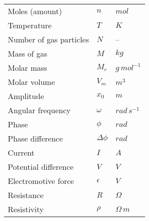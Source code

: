 \documentclass[12pt,a4 paper]{article}
\begin{document}
\begin{longtable}[H]{p{} p{} p{}}
Moles (amount) & $n$ & $\unit{mol}$ \\*
Temperature & $T$ & $\unit{K}$ \\*
Number of gas particles & $N$ & -- \\*
Mass of gas & $M$ & $\unit{kg}$ \\*
Molar mass & $M_r$ & $\unit{g\,mol^{-1}}$ \\*
Molar volume & $V_m$ & $\unit{m^3}$ \\*
\midrule
Amplitude & $x_0$ & $\unit{m}$ \\*
Angular frequency & $\omega$ & $\unit{rad\,s^{-1}}$ \\*
Phase & $\phi$ & $\unit{rad}$ \\*
Phase difference & $\Delta\phi$ & $\unit{rad}$ \\*
\midrule
Current & $I$ & $\unit{A}$ \\*
Potential difference & $V$ & $\unit{V}$ \\*
Electromotive force & $\epsilon$ & $\unit{V}$ \\*
Resistance & $R$ & $\Omega$ \\*
Resistivity & $\rho$ & $\unit{\Omega\,m}$ \\*
\midrule
\end{longtable}
\end{document}
